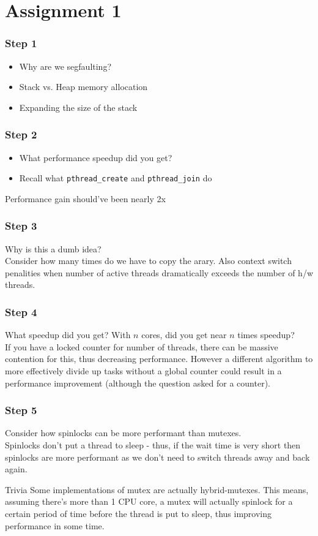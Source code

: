 \documentclass{beamer}
\begin{document}
\section{Assignment 1}
\begin{frame}
  \frametitle{Step 1}
  \begin{itemize}
    \item Why are we segfaulting?
    \item Stack vs. Heap memory allocation
    \item Expanding the size of the stack
  \end{itemize}
\end{frame}
\begin{frame}
  \frametitle{Step 2}
  \begin{itemize}
    \item What performance speedup did you get?
    \item Recall what \texttt{pthread\_create} and \texttt{pthread\_join} do
  \end{itemize}
  \pause
  Performance gain should've been nearly 2x
\end{frame}
\begin{frame}
  \frametitle{Step 3}
  Why is this a dumb idea?\\
  \pause
  Consider how many times do we have to copy the arary. Also context switch penalities when number of active threads dramatically exceeds the number of h/w threads.
\end{frame}
\begin{frame}
  \frametitle{Step 4}
  What speedup did you get? With $n$ cores, did you get near $n$ times speedup?\\
  \pause
  If you have a locked counter for number of threads, there can be massive contention for this, thus decreasing performance. However a different algorithm to more effectively divide up tasks without a global counter could result in a performance improvement (although the question asked for a counter).
\end{frame}
\begin{frame}
  \frametitle{Step 5}
  Consider how spinlocks can be more performant than mutexes.\\
  \pause
  Spinlocks don't put a thread to sleep - thus, if the wait time is very short then spinlocks are more performant as we don't need to switch threads away and back again.
  \begin{exampleblock}{Trivia}
    Some implementations of mutex are actually hybrid-mutexes. This means, assuming there's more than 1 CPU core, a mutex will actually spinlock for a certain period of time before the thread is put to sleep, thus improving performance in some time.
  \end{exampleblock}
\end{frame}
\end{document}

